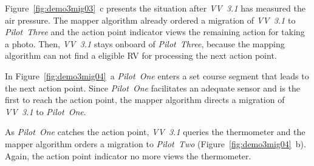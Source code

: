 Figure~\ref{fig:demo3mig03}~c presents the situation after \textit{VV~3.1} has measured the air pressure.
The mapper algorithm already ordered a migration of \textit{VV~3.1} to \textit{Pilot~Three} and
the action point indicator views the remaining action for taking a photo. 
%
Then, \textit{VV~3.1} stays onboard of \textit{Pilot~Three}, because the mapping algorithm can not find
a eligible \ac{RV} for processing the next action point. 

In Figure~\ref{fig:demo3mig04}~a \textit{Pilot~One} enters a set course segment that leads to the next
action point. Since \textit{Pilot~One} facilitates an adequate sensor and is the first to reach the action
point, the mapper algorithm directs a migration of \textit{VV~3.1} to \textit{Pilot~One}.

As \textit{Pilot~One} catches the action point, \textit{VV~3.1} queries the thermometer and the mapper
algorithm orders a migration to \textit{Pilot~Two} (Figure~\ref{fig:demo3mig04}~b).
Again, the action point indicator no more views the thermometer.

